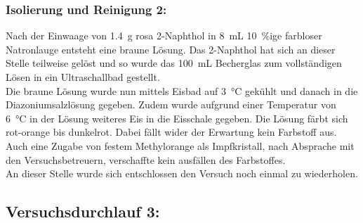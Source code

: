 \subsubsection*{Isolierung und Reinigung 2:}
Nach der Einwaage von \SI{1,4}{\gram } rosa 2-Naphthol in \SI{8}{\milli \liter} \SI{10}{\percent}ige farbloser Natronlauge entsteht eine braune Lösung. Das 2-Naphthol hat sich an dieser Stelle teilweise gelöst und so wurde das \SI{100}{\milli \liter} Becherglas zum vollständigen Lösen in ein Ultraschallbad gestellt.\\
Die braune Lösung wurde nun mittels Eisbad auf \SI{3}{\celsius} gekühlt und danach in die Diazoniumsalzlösung gegeben. Zudem wurde aufgrund einer Temperatur von \SI{6}{\celsius} in der Lösung weiteres Eis in die Eisschale gegeben. Die Lösung färbt sich rot-orange bis dunkelrot. Dabei fällt wider der Erwartung kein Farbstoff aus. Auch eine Zugabe von festem Methylorange als Impfkristall, nach Absprache mit den Versuchsbetreuern,   verschaffte kein ausfällen des Farbstoffes.\\
An dieser Stelle wurde sich entschlossen den Versuch noch einmal zu wiederholen.

\subsection{Versuchsdurchlauf 3: }
